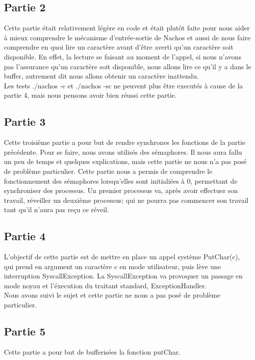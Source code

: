 \documentclass[a4paper]{article}
\begin{document}
\subsection{Partie 2}
Cette partie était relativement légère en code et était plutôt faite pour nous
aider à mieux comprendre le mécanisme d'entrée-sortie de Nachos et aussi de nous
faire comprendre en quoi lire un caractère avant d'être averti qu'un caractère
soit disponible. En effet, la lecture se faisant au moment de l'appel, si nous
n'avons pas l'assurance qu'un caractère soit disponible, nous allons lire ce
qu'il y a dans le buffer, autrement dit nous allons obtenir un caractère inattendu. \\
Les tests ./nachos -c et ./nachos -sc ne peuvent plus être executés à cause de
la partie 4, mais nous pensons avoir bien réussi cette partie.

\subsection{Partie 3}
Cette troisième partie a pour but de rendre synchrones les fonctions de la partie
précédente. Pour se faire, nous avons utilisés des sémaphores. Il nous aura fallu
un peu de temps et quelques explications, mais cette partie ne nous n'a pas posé
de problème particulier. Cette partie nous a permis de comprendre le fonctionnement
des sémaphores lorsqu'elles sont initialiées à 0, permettant de synchroniser
des processus. Un premier processus va, après avoir effectuer son travail, réveiller
un deuxième processus; qui ne pourra pas commencer son travail tant qu'il n'aura
pas reçu ce réveil.

\subsection{Partie 4}
L'objectif de cette partie est de mettre en place un appel système PutChar(c),
qui prend en argument un caractère c en mode utilisateur, puis lève une interruption
SyscallException. La SyscallException va provoquer un passage en mode noyau et
l'éxecution du traitant standard, ExceptionHandler. \\
Nous avons suivi le sujet et cette partie ne nous a pas posé de problème particulier.

\newpage
\subsection{Partie 5}
Cette partie a pour but de bufferisées la fonction putChar.
\end{document}
